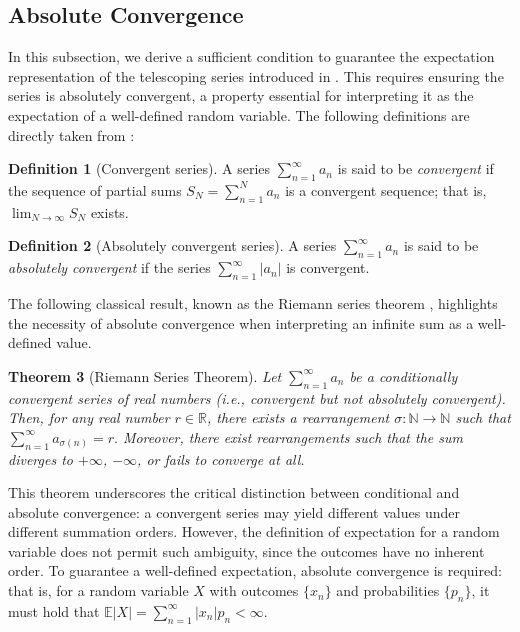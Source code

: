 \documentclass{article}
\newcommand{\EE}{\mathbb{E}}
\newcommand{\RR}{\mathbb{R}}
\theoremstyle{definition}
\newtheorem{definition}{Definition}[section]
\theoremstyle{plain}
\newtheorem{theorem}[definition]{Theorem}
\theoremstyle{remark}
\begin{document}
\subsection{Absolute Convergence}\label{appendix:absolute-convergence}%
In this subsection, we derive a sufficient condition to guarantee the expectation representation of the telescoping series introduced in . This requires ensuring the series is absolutely convergent, a property essential for interpreting it as the expectation of a well-defined random variable. The following definitions are directly taken from \citet{Folland_Taylor2024}:
\begin{definition}[Convergent series]
    A series $\sum_{n=1}^\infty a_n$ is said to be \textit{convergent} if the sequence of partial sums $S_N=\sum_{n=1}^N a_n$ is a convergent sequence; that is, $\lim_{N\to \infty} S_N$ exists.
\end{definition}
\begin{definition}[Absolutely convergent series]
    A series $\sum_{n=1}^\infty a_n$ is said to be \textit{absolutely convergent} if the series $\sum_{n=1}^\infty |a_n|$ is convergent. 
\end{definition}

The following classical result, known as the Riemann series theorem \citep{riemann1868darstellbarkeit,spivak2008calculus}, highlights the necessity of absolute convergence when interpreting an infinite sum as a well-defined value. 
\begin{theorem}[Riemann Series Theorem]
    Let \( \sum_{n=1}^\infty a_n \) be a conditionally convergent series of real numbers (i.e., convergent but not absolutely convergent). Then, for any real number \( r \in \RR \), there exists a rearrangement \( \sigma: \mathbb{N} \to \mathbb{N} \) such that $\sum_{n=1}^\infty a_{\sigma(n)} = r.$ Moreover, there exist rearrangements such that the sum diverges to \( +\infty \), \( -\infty \), or fails to converge at all.
\end{theorem}
This theorem underscores the critical distinction between conditional and absolute convergence: a convergent series may yield different values under different summation orders. However, the definition of expectation for a random variable does not permit such ambiguity, since the outcomes have no inherent order. To guarantee a well-defined expectation, absolute convergence is required: that is, for a random variable $X$ with outcomes $\{x_n\}$ and probabilities $\{p_n\}$, it must hold that $\EE |X| = \sum_{n=1}^\infty |x_n| p_n < \infty$. 
\end{document}
